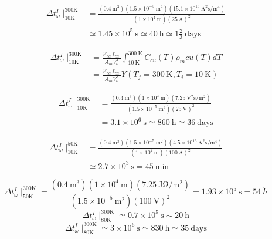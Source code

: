 \begin{align*}%
\Delta t_{\omega}^{I}\mid_{10\mathrm{K}}^{300\mathrm{K}}&=\frac{(0.4\ \mathrm{m^3})(1.5\times 10^{-5}\ \mathrm{m^2})(15.1\times 10^{16}\ \mathrm{A^2s/m^4})}{(1\times 10^4\ \mathrm{m})(25\ \mathrm{A})^2} \\
&\simeq 1.45\times 10^5\ \mathrm{s}\simeq 40\ \mathrm{h}\simeq 1\frac{2}{3}\ \mathrm{days} 
\end{align*}


\begin{align*}%
\Delta t_{\omega}^{I}\mid_{10\mathrm{K}}^{300\mathrm{K}}&=\frac{\mathcal{V}_{cd}\ell_{cd}}{A_mV_{o}^{2}}\int_{10\ \mathrm{K}}^{300\ \mathrm{K}}C_{cu}(T)\rho_m{cu}(T)dT \\
&=\frac{\mathcal{V}_{cd}\ell_{cd}}{A_mV_{o}^{2}}Y(T_f=300\ \mathrm{K},T_i=10\ \mathrm{K})
\end{align*}


\begin{align*}%
\Delta t_{\omega}^{I}\mid_{10\mathrm{K}}^{300\mathrm{K}}&=\frac{(0.4\ \mathrm{m^3})(1\times 10^4\ \mathrm{m})(7.25\ \mathrm{V^2s/m^2})}{(1.5\times 10^{-5}\ \mathrm{m^2})(25\ \mathrm{V})^2} \\
&=3.1\times 10^6\ \mathrm{s}\simeq 860\ \mathrm{h}\simeq 36\ \mathrm{days} 
\end{align*}


\begin{align*}%
\Delta t_{\omega}^{I}\mid_{10\mathrm{K}}^{50\mathrm{K}}&=\frac{(0.4\ \mathrm{m^3})(1.5\times 10^{-5}\ \mathrm{m^2})(4.5\times 10^{16}\ \mathrm{A^2s/m^4})}{(1\times 10^4\ \mathrm{m})(100\ \mathrm{A})^2} \\
&\simeq 2.7\times 10^3\ \mathrm{s}=45\ \mathrm{min}
\end{align*}


\begin{equation}%
\Delta t_{\omega}^{I}\mid_{50\mathrm{K}}^{300\mathrm{K}}=\frac{(0.4\ \mathrm{m^3})(1\times 10^4\ \mathrm{m})(7.25\ \mathrm{J\Omega/m^2})}{(1.5\times 10^{-5}\ \mathrm{m^2})(100\ \mathrm{V})^2} 
=1.93\times 10^5\ \mathrm{s}=54\ \mathring{h}
\end{equation}
\begin{equation}%
\Delta t_{\omega}^{I}\mid_{80\mathrm{K}}^{300\mathrm{K}}\simeq 0.7\times 10^5\ \mathrm{s}\sim 20\ \mathrm{h}
\end{equation}
\begin{equation}%
\Delta t_{\omega}^{I}\mid_{80\mathrm{K}}^{300\mathrm{K}}\simeq 3\times 10^6\ \mathrm{s}\simeq 830\ \mathrm{h}\simeq 35\ \mathrm{days}
\end{equation}



